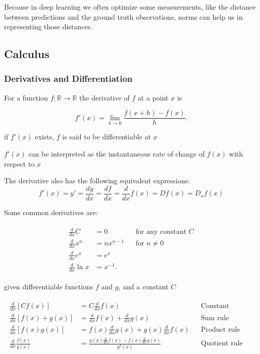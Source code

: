 \documentclass[]{article}
\begin{document}
Because in deep learning we often optimize some measurements, like the distance
between predictions and the ground truth observations, norms can help us in
representing those distances.

\subsection{Calculus}

\subsubsection{Derivatives and Differentiation}
For a function $f: \mathbb{R} \rightarrow \mathbb{R}$ the derivative of $f$ at
a point $x$ is

\begin{equation}
    f'(x) = \lim_{h \rightarrow 0} \frac{f(x+h) - f(x)}{h}. \tag{2.4.1}
\end{equation}

if $f'(x)$ exists, $f$ is said to be differentiable at $x$

$f'(x)$ can be interpreted as the instantaneous rate of change of $f(x)$ with respect
to $x$

The derivative also has the following equivalent expressions:
\begin{equation}
    f'(x) = y' = \frac{dy}{dx} = \frac{df}{dx} = \frac{d}{dx} f(x) = Df(x) = D_x f(x) \tag{2.4.2}
\end{equation}

Some common derivatives are:

\begin{equation}
    \begin{split}\begin{aligned}
            \frac{d}{dx} C & = 0 &  & \textrm{for any constant $C$}
            \\ \frac{d}{dx} x^n & = n x^{n-1} && \textrm{for } n \neq 0
            \\ \frac{d}{dx} e^x & = e^x
            \\ \frac{d}{dx} \ln x & = x^{-1}.
        \end{aligned}\end{split}
    \tag{2.4.3}
\end{equation}

given differentiable functions $f$ and $g$, and a constant $C$

\begin{equation}
    \begin{split}\begin{aligned} \frac{d}{dx} [C f(x)] & = C \frac{d}{dx} f(x) && \textrm{Constant multiple rule} \\ \frac{d}{dx} [f(x) + g(x)] & = \frac{d}{dx} f(x) + \frac{d}{dx} g(x) && \textrm{Sum rule} \\ \frac{d}{dx} [f(x) g(x)] & = f(x) \frac{d}{dx} g(x) + g(x) \frac{d}{dx} f(x) && \textrm{Product rule} \\ \frac{d}{dx} \frac{f(x)}{g(x)} & = \frac{g(x) \frac{d}{dx} f(x) - f(x) \frac{d}{dx} g(x)}{g^2(x)} && \textrm{Quotient rule} \end{aligned}\end{split}
    \tag{2.4.4}
\end{equation}
\end{document}
